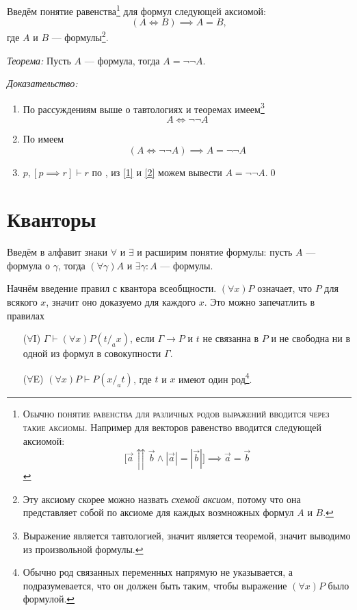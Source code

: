 Введём понятие равенства\footnote{
	\textsc{Обычно понятие равенства для различных родов выражений
		вводится через такие аксиомы.}
	Например для векторов равенство вводится следующей аксиомой:
	\[
		\big[\vec{a}\upuparrows\vec{b}\land|\vec{a}|=|\vec{b}|\big]
		\implies \vec{a}=\vec{b}
	\]
} для формул следующей аксиомой:
\[
	(A\iff B)\implies A=B,
\]
где $A$ и $B$ --- формулы\footnote{
Эту аксиому скорее можно назвать {\it схемой аксиом}, потому что она представляет
собой по аксиоме для каждых возмножных формул $A$ и $B$.
}.

{\it Теорема:} Пусть $A$ --- формула, тогда $A=\lnot\lnot A$.

	{\it Доказательство:}
\begin{enumerate}[label=(\arabic*)]
	\item{}\label{1}По рассуждениям выше о тавтологиях и теоремах
	имеем\footnote{Выражение является тавтологией, значит является теоремой,
		значит выводимо из произвольной формулы.}
	\[
		A\iff\lnot\lnot A
	\]

	\item{}\label{2}По \axiom{} имеем
	\[
		(A\iff \lnot\lnot A)\implies A=\lnot\lnot A
	\]
	\item{}\label{3}${p,[p\implies r]\vdash r}$ по \taut{},
	из \ref{1} и \ref{2}
	можем вывести $A=\lnot\lnot A$.\qed
\end{enumerate}


\section{Кванторы}

\newcommand\Aii{$\forall$I}
\newcommand\Aee{$\forall$E}
\newcommand\Eii{$\exists$I}
\newcommand\Eee{$\exists$E}

Введём в алфавит знаки $\forall$ и $\exists$ и расширим понятие формулы:
пусть $A$ --- формула о $\gamma$,
тогда $(\forall\gamma)A$ и $\exists\gamma:A$ --- формулы.

Начнём введение правил с квантора всеобщности. $(\forall x)P$ означает, что $P$ для
всякого $x$, значит оно доказуемо для каждого $x$. Это можно запечатлить
в правилах
\begin{enumerate}
	\item[(\Aii{})]{}$\Gamma\vdash(\forall x)P(t/_{a}x)$, если $\Gamma\to P$ и $t$
	не связанна в $P$ и
	не свободна ни в одной из формул в совокупности $\Gamma$.

	\item[(\Aee{})]{}$(\forall x)P\vdash P(x/_{a}t)$, где $t$ и $x$
	имеют один род\footnote{
		Обычно род связанных переменных напрямую не указывается, а подразумевается,
		что он должен быть таким, чтобы выражение $(\forall x)P$ было формулой.
	}.
\end{enumerate}

